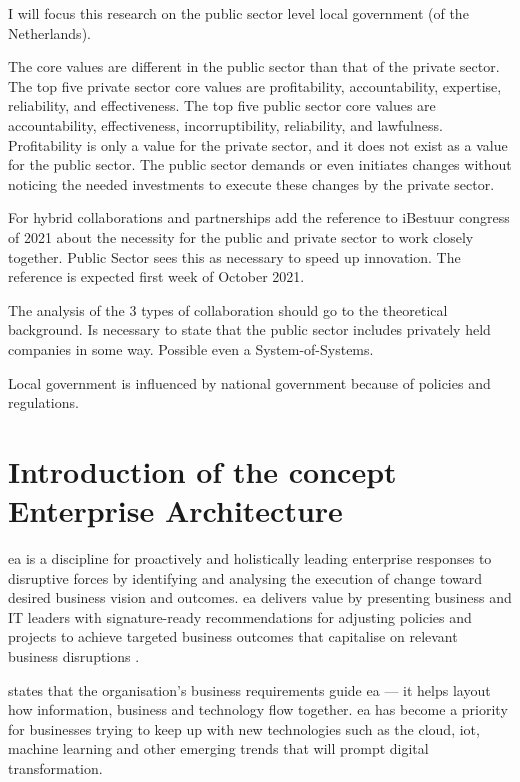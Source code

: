 I will focus this research on the public sector level local government (of the Netherlands).

The core values are different in the public sector than that of the private sector. The top five private sector core values are profitability, accountability, expertise, reliability, and effectiveness. The top five public sector core values are accountability, effectiveness, incorruptibility, reliability, and lawfulness. \parencite{Wal2008} Profitability is only a value for the private sector, and it does not exist as a value for the public sector.  The public sector demands or even initiates changes without noticing the needed investments to execute these changes by the private sector.

\begin{remark}
	For hybrid collaborations and partnerships add the reference to iBestuur congress of 2021 about the necessity for the public and private sector to work closely together. Public Sector sees this as necessary to speed up innovation. The reference is expected first week of October 2021.
\end{remark}

\begin{remark}
	The analysis of the 3 types of collaboration should go to the theoretical background. Is necessary to state that the public sector includes privately held companies in some way. Possible even a System-of-Systems.
\end{remark}

\begin{remark}
	Local government is influenced by national government because of policies and regulations.
\end{remark}

\section{Introduction of the concept Enterprise Architecture}
\label{introea}
\acrfull{ea} is a discipline for proactively and holistically leading enterprise responses to disruptive forces by identifying and analysing the execution of change toward desired business vision and outcomes. \acrshort{ea} delivers value by presenting business and IT leaders with signature-ready recommendations for adjusting policies and projects to achieve targeted business outcomes that capitalise on relevant business disruptions \parencite{Gartner}.

\textcite{White2018} states that the organisation’s business requirements guide \acrshort{ea} — it helps layout how information, business and technology flow together. \acrshort{ea} has become a priority for businesses trying to keep up with new technologies such as the cloud, \acrfull{iot}, machine learning and other emerging trends that will prompt digital transformation.

